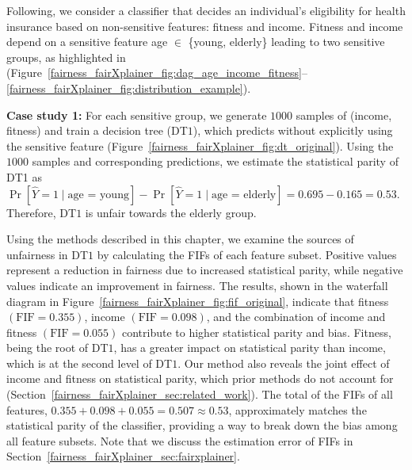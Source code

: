 \begin{example}
	\label{fairness_fairXplainer_ex:motivating_example}  Following\cite{ghosh2020justicia}, we consider a classifier that decides an individual's eligibility for health insurance based on non-sensitive features: fitness  and income. Fitness and income depend on a sensitive feature age $ \in $ \{young, elderly\} leading to two sensitive groups, as highlighted in (Figure~\ref{fairness_fairXplainer_fig:dag_age_income_fitness}--\ref{fairness_fairXplainer_fig:distribution_example}). 
	
	\textbf{Case study 1:} For each sensitive group, we generate $ 1000 $ samples of (income, fitness) and train a decision tree (DT$ 1 $), which predicts without explicitly using the sensitive feature (Figure~\ref{fairness_fairXplainer_fig:dt_original}). %
	Using the $1000$ samples and corresponding predictions, we estimate the statistical parity of DT1 as $ \Pr[\widehat{Y} = 1  \mid  \text{age = young} ] - \Pr[\widehat{Y} = 1  \mid  \text{age = elderly}] = 0.695 - 0.165 = 0.53 $. Therefore, DT$ 1 $ is unfair towards the elderly group.
	
	
	Using the methods described in this chapter, we examine the sources of unfairness in DT$ 1 $ by calculating the FIFs of each feature subset. Positive values represent a reduction in fairness due to increased statistical parity, while negative values indicate an improvement in fairness. The results, shown in the waterfall diagram in Figure~\ref{fairness_fairXplainer_fig:fif_original}, indicate that fitness $(\mathrm{FIF} = 0.355)$, income $(\mathrm{FIF} = 0.098)$, and the combination of income and fitness $(\mathrm{FIF} = 0.055)$ contribute to higher statistical parity and bias. Fitness, being the root of DT$ 1 $, has a greater impact on statistical parity than income, which is at the second level of DT$ 1 $. Our method also reveals the joint effect of income and fitness on statistical parity, which prior methods do not account for (Section~\ref{fairness_fairXplainer_sec:related_work}). The total of the FIFs of all features, $ 0.355 + 0.098 + 0.055 = 0.507 \approx 0.53 $, approximately matches the statistical parity of the classifier, providing a way to break down the bias among all feature subsets. Note that we discuss the estimation error of FIFs in Section~\ref{fairness_fairXplainer_sec:fairxplainer}.
	

\end{example}

